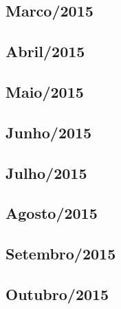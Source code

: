 \documentclass[12pt,a4paper]{article}
\begin{document}
\subsection{Marco/2015}
  
 
\subsection{Abril/2015}
  
  
\subsection{Maio/2015} 
  
  
  
   

\subsection{Junho/2015}
   
   
   


\subsection{Julho/2015}
    
     
    
    
         
    
\subsection{Agosto/2015}
   
   
   
 

\subsection{Setembro/2015}
  
   
      
    
 
\subsection{Outubro/2015}
  
   
\end{document}
